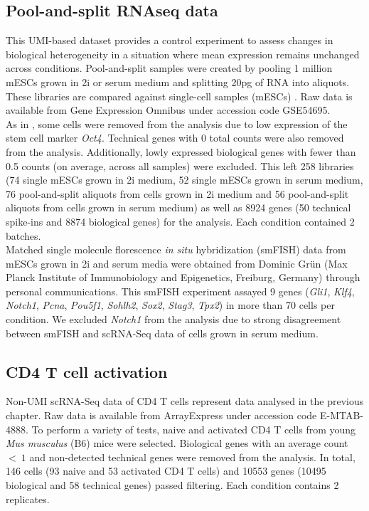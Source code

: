 \subsection{Pool-and-split RNAseq data} \label{seq::data_PaS}

This UMI-based dataset provides a control experiment to assess changes in biological heterogeneity in a situation where mean expression remains unchanged across conditions. Pool-and-split samples were created by pooling 1 million mESCs grown in 2i or serum medium and splitting 20pg of RNA into aliquots. These libraries are compared against single-cell samples (mESCs) \citep{Grun2014}. Raw data is available from Gene Expression Omnibus under accession code GSE54695. \\

As in \cite{Grun2014}, some cells were removed from the analysis due to low expression of the stem cell marker \textit{Oct4}. Technical genes with 0 total counts were also removed from the analysis. Additionally, lowly expressed biological genes with fewer than 0.5 counts (on average, across all samples) were excluded. This left 258 libraries (74 single mESCs grown in 2i medium, 52 single mESCs grown in serum medium, 76 pool-and-split aliquots from cells grown in 2i medium and 56 pool-and-split aliquots from cells grown in serum medium) as well as 8924 genes (50 technical spike-ins and 8874 biological genes) for the analysis. Each condition contained 2 batches.\\

Matched single molecule florescence \textit{in situ} hybridization (smFISH) data from mESCs grown in 2i and serum media were obtained from Dominic Gr\"un (Max Planck Institute of Immunobiology and Epigenetics, Freiburg, Germany) through personal communications. This smFISH experiment assayed 9 genes (\textit{Gli1}, \textit{Klf4}, \textit{Notch1}, \textit{Pcna}, \textit{Pou5f1}, \textit{Sohlh2}, \textit{Sox2}, \textit{Stag3}, \textit{Tpx2}) in more than 70 cells per condition. We excluded \textit{Notch1} from the analysis due to strong disagreement between smFISH and scRNA-Seq data of cells grown in serum medium.

\subsection{CD4\plus{} T cell activation} \label{seq::data_cd4}

Non-UMI scRNA-Seq data of CD4\plus{} T cells represent data analysed in  the previous chapter. Raw data is available from ArrayExpress under accession code E-MTAB-4888. To perform a variety of tests, naive and activated CD4\plus{} T cells from young \emph{Mus musculus} (B6) mice were selected. Biological genes with an average count $<~1$ and non-detected technical genes were removed from the analysis. In total, 146 cells (93 naive and 53 activated CD4\plus{} T cells) and 10553 genes (10495 biological and 58 technical genes) passed filtering. Each condition contains 2 replicates.

